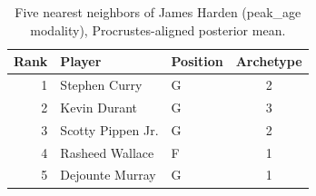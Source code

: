 \begin{table}[htbp]
  \centering\small
  \begin{tabular}{rllc}
    \toprule
    Rank & Player & Position & Archetype \\
    \midrule
    1 & Stephen Curry & G & 2 \\
    2 & Kevin Durant & G & 3 \\
    3 & Scotty Pippen Jr. & G & 2 \\
    4 & Rasheed Wallace & F & 1 \\
    5 & Dejounte Murray & G & 1 \\
    \bottomrule
  \end{tabular}
  \caption{Five nearest neighbors of James Harden (peak_age modality), Procrustes-aligned posterior mean.}
  \label{tab:James_Harden_neighbors_peak_age}
\end{table}


